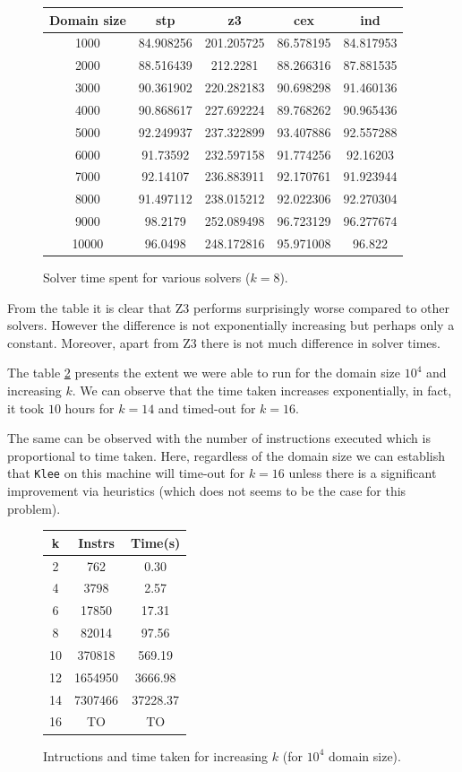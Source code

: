 \documentclass[11pt,a4paper,notitlepage]{article}
\begin{document}
\begin{figure}
\centering
\begin{tabular}{|c|c|c|c|c|}
\hline
\textbf{Domain size} & stp & z3 & cex & ind \\ \hline \hline
1000 & 84.908256 & 201.205725 & 86.578195 & 84.817953 \\
2000 & 88.516439 & 212.2281 & 88.266316 & 87.881535 \\
3000 & 90.361902 & 220.282183 & 90.698298 & 91.460136 \\
4000 & 90.868617 & 227.692224 & 89.768262 & 90.965436 \\
5000 & 92.249937 & 237.322899 & 93.407886 & 92.557288 \\
6000 & 91.73592 & 232.597158 & 91.774256 & 92.16203 \\
7000 & 92.14107 & 236.883911 & 92.170761 & 91.923944 \\
8000 & 91.497112 & 238.015212 & 92.022306 & 92.270304 \\
9000 & 98.2179 & 252.089498 & 96.723129 & 96.277674 \\
10000 & 96.0498 & 248.172816 & 95.971008 & 96.822 \\
\hline
\end{tabular}
\caption{Solver time spent for various solvers ($k = 8$).}
\label{fig:solvertime}
\end{figure}


From the table it is clear that Z3 performs surprisingly worse compared to other solvers.
However the difference is not exponentially increasing but perhaps only a constant.
Moreover, apart from Z3 there is not much difference in solver times.

The table \ref{fig:scalability} presents the extent we were able to run for the domain size $10^4$ and increasing $k$.
We can observe that the time taken increases exponentially, in fact, it took $10$ hours for $k = 14$ and timed-out for $k=16$.

The same can be observed with the number of instructions executed which is proportional to time taken.
Here, regardless of the domain size we can establish that \texttt{Klee} on this machine will time-out for $k=16$ unless there is a significant improvement via heuristics (which does not seems to be the case for this problem).

\begin{figure}
\centering
\begin{tabular}{|c|c|c|}
\hline
\textbf{k}  & Instrs  & Time(s) \\ \hline \hline
2  &     762 &     0.30 \\
4  &    3798 &     2.57 \\
6  &   17850 &    17.31 \\
8  &   82014 &    97.56 \\
10 &  370818 &   569.19 \\
12 & 1654950 &  3666.98 \\
14 & 7307466 & 37228.37 \\
16 &  TO &  TO \\
\hline
\end{tabular}
\caption{Intructions and time taken for increasing $k$ (for $10^4$ domain size).}
\label{fig:scalability}
\end{figure}
\end{document}
